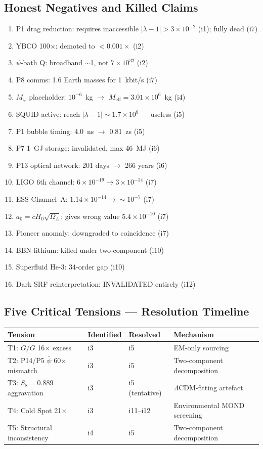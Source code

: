 \documentclass[11pt,a4paper]{article}
\begin{document}
\subsection{Honest Negatives and Killed Claims}

\begin{enumerate}[nosep]
\item P1 drag reduction: requires inaccessible $|\lambda-1|>3\times10^{-2}$ (i1); fully dead (i7)
\item YBCO 100$\times$: demoted to $<0.001\times$ (i2)
\item $\psi$-bath Q: broadband $\sim$1, not $7\times10^{32}$ (i2)
\item P8 comms: 1.6 Earth masses for 1~kbit/s (i7)
\item $M_\psi$ placeholder: $10^{-6}$~kg $\to$ $M_\mathrm{eff}=3.01\times10^6$~kg (i4)
\item SQUID-active: reach $|\lambda-1|\sim1.7\times10^8$ --- useless (i5)
\item P1 bubble timing: 4.0~ns $\to$ 0.81~zs (i5)
\item P7 1~GJ storage: invalidated, max 46~MJ (i6)
\item P13 optical network: 201 days $\to$ 266 years (i6)
\item LIGO 6th channel: $6\times10^{-19}\to3\times10^{-14}$ (i7)
\item ESS Channel~A: $1.14\times10^{-14}\to\sim10^{-7}$ (i7)
\item $a_0=cH_0\sqrt{\Omega_\Lambda}$: gives wrong value $5.4\times10^{-10}$ (i7)
\item Pioneer anomaly: downgraded to coincidence (i7)
\item BBN lithium: killed under two-component (i10)
\item Superfluid He-3: 34-order gap (i10)
\item Dark SRF reinterpretation: INVALIDATED entirely (i12)
\end{enumerate}

\subsection{Five Critical Tensions --- Resolution Timeline}

\begin{center}
\begin{tabular}{llll}
\toprule
\textbf{Tension} & \textbf{Identified} & \textbf{Resolved} & \textbf{Mechanism} \\
\midrule
T1: $\dot{G}/G$ 16$\times$ excess & i3 & i5 & EM-only sourcing \\
T2: P14/P5 $\bar\psi$ 60$\times$ mismatch & i3 & i5 & Two-component decomposition \\
T3: $S_8=0.889$ aggravation & i3 & i5 (tentative) & $\Lambda$CDM-fitting artefact \\
T4: Cold Spot 21$\times$ & i3 & i11--i12 & Environmental MOND screening \\
T5: Structural inconsistency & i4 & i5 & Two-component decomposition \\
\bottomrule
\end{tabular}
\end{center}
\end{document}
